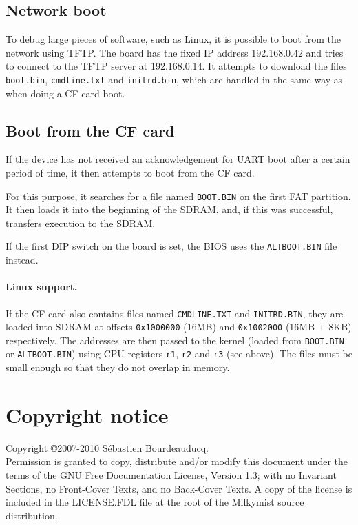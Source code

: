 \documentclass[a4paper,11pt]{article}
\begin{document}
\subsection{Network boot}
To debug large pieces of software, such as Linux, it is possible to boot from the network using TFTP. The board has the fixed IP address 192.168.0.42 and tries to connect to the TFTP server at 192.168.0.14. It attempts to download the files \verb!boot.bin!, \verb!cmdline.txt! and \verb!initrd.bin!, which are handled in the same way as when doing a CF card boot.

\subsection{Boot from the CF card}
If the device has not received an acknowledgement for UART boot after a certain period of time, it then attempts to boot from the CF card.

For this purpose, it searches for a file named \verb!BOOT.BIN! on the first FAT partition. It then loads it into the beginning of the SDRAM, and, if this was successful, transfers execution to the SDRAM.

If the first DIP switch on the board is set, the BIOS uses the \verb!ALTBOOT.BIN! file instead.

\paragraph{Linux support.} If the CF card also contains files named \verb!CMDLINE.TXT! and \verb!INITRD.BIN!, they are loaded into SDRAM at offsets \verb!0x1000000! (16MB) and \verb!0x1002000! (16MB + 8KB) respectively. The addresses are then passed to the kernel (loaded from \verb!BOOT.BIN! or \verb!ALTBOOT.BIN!) using CPU registers \verb!r1!, \verb!r2! and \verb!r3! (see above). The files must be small enough so that they do not overlap in memory.

\section*{Copyright notice}
Copyright \copyright 2007-2010 S\'ebastien Bourdeauducq. \\
Permission is granted to copy, distribute and/or modify this document under the terms of the GNU Free Documentation License, Version 1.3; with no Invariant Sections, no Front-Cover Texts, and no Back-Cover Texts. A copy of the license is included in the LICENSE.FDL file at the root of the Milkymist source distribution.
\end{document}
